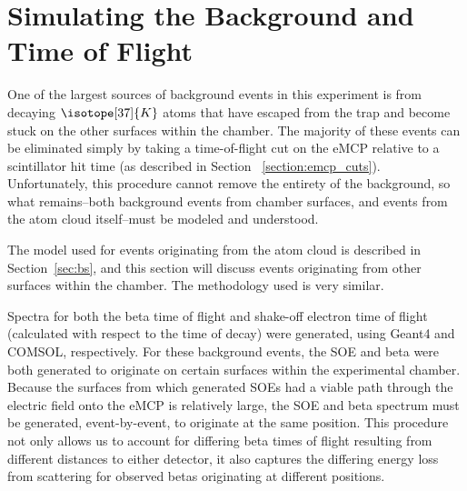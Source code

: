 \section{Simulating the Background and Time of Flight}
\label{sec:tof_bg}
One of the largest sources of background events in this experiment is from decaying $\isotope[37]{K}$ atoms that have escaped from the trap and become stuck on the other surfaces within the chamber.  The majority of these events can be eliminated simply by taking a time-of-flight cut on the eMCP relative to a scintillator hit time (as described in Section ~\ref{section:emcp_cuts}).  Unfortunately, this procedure cannot remove the entirety of the background, so what remains--both background events from chamber surfaces, and events from the atom cloud itself--must be modeled and understood.  

The model used for events originating from the atom cloud is described in Section~\ref{sec:bs}, and this section will discuss events originating from other surfaces within the chamber.  The methodology used is very similar.  

Spectra for both the beta time of flight and shake-off electron time of flight (calculated with respect to the time of decay) were generated, using Geant4 and COMSOL, respectively.  For these background events, the SOE and beta were both generated to originate on certain surfaces within the experimental chamber.  Because the surfaces from which generated SOEs had a viable path through the electric field onto the eMCP is relatively large, the SOE and beta spectrum must be generated, event-by-event, to originate at the same position.  This procedure not only allows us to account for differing beta times of flight resulting from different distances to either detector, it also captures the differing energy loss from scattering for observed betas originating at different positions.


